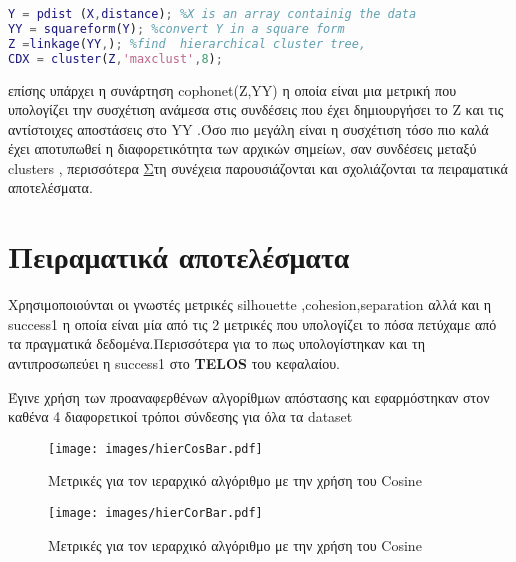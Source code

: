 \begin{lstlisting}[language=Matlab]
%simple example of hierarchical clustering
Y = pdist (X,distance); %X is an array containig the data
YY = squareform(Y); %convert Y in a square form
Z =linkage(YY,); %find  hierarchical cluster tree,
CDX = cluster(Z,'maxclust',8);
\end{lstlisting}


επίσης υπάρχει η συνάρτηση cophonet(Z,YY) η οποία είναι μια μετρική που υπολογίζει την συσχέτιση ανάμεσα στις συνδέσεις που έχει δημιουργήσει το Z και τις αντίστοιχες αποστάσεις στο YY .Όσο πιο μεγάλη είναι η συσχέτιση τόσο πιο καλά έχει αποτυπωθεί η διαφορετικότητα των αρχικών σημείων, σαν συνδέσεις μεταξύ clusters , περισσότερα
\href{https://en.wikipedia.org/wiki/Cophenetic\_correlation{εδώ}}

Στη συνέχεια παρουσιάζονται και σχολιάζονται τα πειραματικά αποτελέσματα.

\section{Πειραματικά αποτελέσματα}

Χρησιμοποιούνται οι γνωστές μετρικές silhouette ,cohesion,separation
αλλά και η success1 η οποία είναι μία από τις 2 μετρικές που  υπολογίζει το πόσα πετύχαμε από τα πραγματικά δεδομένα.Περισσότερα για το πως υπολογίστηκαν και τη αντιπροσωπεύει η success1 στο \textbf{TELOS} του κεφαλαίου.   	

Έγινε χρήση των προαναφερθένων  αλγορίθμων απόστασης και εφαρμόστηκαν στον καθένα 4 διαφορετικοί τρόποι σύνδεσης για όλα τα dataset


\begin{figure}
	\texttt{[image: images/hierCosBar.pdf]}
	\caption{Μετρικές για τον ιεραρχικό αλγόριθμο με την χρήση του Cosine}
	\label{fig:CosineHier}
\end{figure}



\begin{figure}
	\texttt{[image: images/hierCorBar.pdf]}
	\caption{Μετρικές για τον ιεραρχικό αλγόριθμο με την χρήση του Cosine}
	\label{fig:CorrelationHier}
\end{figure}




